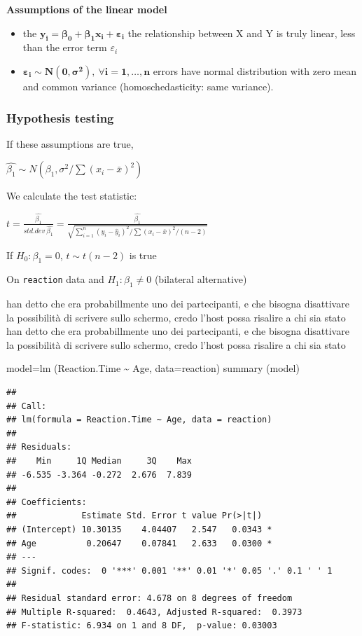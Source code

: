 \documentclass[
]{article}
\newenvironment{Shaded}{\begin{snugshade}}{\end{snugshade}}
\newcommand{\AttributeTok}[1]{\textcolor[rgb]{0.77,0.63,0.00}{#1}}
\newcommand{\FunctionTok}[1]{\textcolor[rgb]{0.00,0.00,0.00}{#1}}
\newcommand{\NormalTok}[1]{#1}
\newcommand{\OtherTok}[1]{\textcolor[rgb]{0.56,0.35,0.01}{#1}}
\newcommand{\SpecialCharTok}[1]{\textcolor[rgb]{0.00,0.00,0.00}{#1}}
\providecommand{\tightlist}{%
  \setlength{\itemsep}{0pt}\setlength{\parskip}{0pt}}
\begin{document}
\textbf{Assumptions of the linear model }

\begin{itemize}
\tightlist
\item
  the \(\boldsymbol{y_i=\beta_0 + \beta_1 x_i + \varepsilon_i}\) the
  relationship between X and Y is truly linear, less than the error term
  \(\varepsilon_i\)
\item
  \(\boldsymbol{\varepsilon_i \sim N (0, \sigma ^ 2), \ \forall i=1, \ldots, n}\)
  errors have normal distribution with zero mean and common variance
  (homoschedasticity: same variance).
\end{itemize}

\hypertarget{hypothesis-testing}{%
\subsubsection{Hypothesis testing}\label{hypothesis-testing}}

If these assumptions are true,

\(\hat{\beta_1} \sim N (\beta_1, \sigma ^ 2 / \sum (x_i- \bar{x}) ^ 2)\)

We calculate the test statistic:

\(t=\frac{\hat{\beta_1}}{std.dev\ \hat{\beta_1}}=\frac{\hat{\beta_1}}{\sqrt{\sum_{i=1} ^ n (y_i- \hat{y}_i) ^ 2 / \sum (x_i- \bar{x}) ^ 2 / (n-2)}}\)

If \(H_0: \beta_1=0\), \(t \sim t (n-2)\) is true

On \texttt{reaction} data and \(H_1: \beta_1 \neq 0\) (bilateral
alternative)

han detto che era probabillmente uno dei partecipanti, e che bisogna
disattivare la possibilità di scrivere sullo schermo, credo l'host possa
risalire a chi sia stato han detto che era probabillmente uno dei
partecipanti, e che bisogna disattivare la possibilità di scrivere sullo
schermo, credo l'host possa risalire a chi sia stato

\begin{Shaded}
\begin{Highlighting}[]
\NormalTok{model}\OtherTok{=}\FunctionTok{lm}\NormalTok{ (Reaction.Time }\SpecialCharTok{\textasciitilde{}}\NormalTok{ Age, }\AttributeTok{data=}\NormalTok{reaction)}
\FunctionTok{summary}\NormalTok{ (model)}
\end{Highlighting}
\end{Shaded}

\begin{verbatim}
## 
## Call:
## lm(formula = Reaction.Time ~ Age, data = reaction)
## 
## Residuals:
##    Min     1Q Median     3Q    Max 
## -6.535 -3.364 -0.272  2.676  7.839 
## 
## Coefficients:
##             Estimate Std. Error t value Pr(>|t|)  
## (Intercept) 10.30135    4.04407   2.547   0.0343 *
## Age          0.20647    0.07841   2.633   0.0300 *
## ---
## Signif. codes:  0 '***' 0.001 '**' 0.01 '*' 0.05 '.' 0.1 ' ' 1
## 
## Residual standard error: 4.678 on 8 degrees of freedom
## Multiple R-squared:  0.4643, Adjusted R-squared:  0.3973 
## F-statistic: 6.934 on 1 and 8 DF,  p-value: 0.03003
\end{verbatim}
\end{document}
